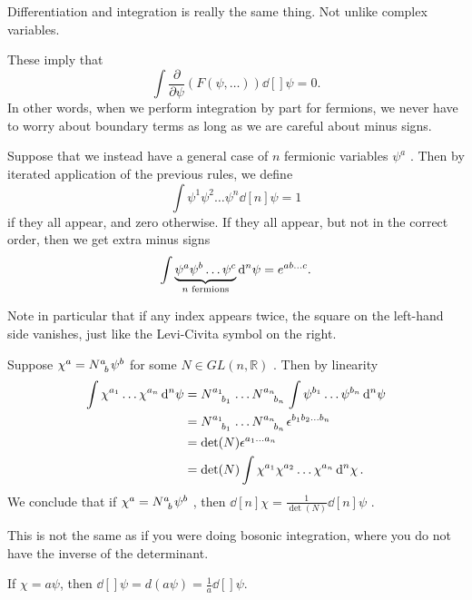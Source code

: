 \begin{leftbar}
  \begin{remark}
    Differentiation and integration is really the same thing. Not unlike complex variables.
  \end{remark}
\end{leftbar}

\begin{remark}
  These imply that
   \begin{equation}
     \int \frac{\partial }{\partial \psi} (F (\psi, \dots)) \dd[]{\psi} = 0.
  \end{equation}
  In other words, when we perform integration by part for fermions, we never have to worry about boundary terms as long as we are careful about minus signs.
\end{remark} 

Suppose that we instead have a general case of $n$  fermionic variables $\psi^{a}$ . Then by iterated application of the previous rules, we define
\begin{equation}
  \int \psi^1 \psi^2 \dots \psi^n \dd[n]{\psi} = 1
\end{equation}
if they all appear, and zero otherwise.
If they all appear, but not in the correct order, then we get extra minus signs
\begin{equation}
  \int \underbrace{\psi^{a} \psi^{b} \dots \psi^{c}}_{\mathclap{n \text{ fermions}}} \dd[n]{\psi} = e^{ab \dots c}.
\end{equation}
\begin{leftbar}
  \begin{remark}
    Note in particular that if any index appears twice, the square on the left-hand side vanishes, just like the Levi-Civita symbol on the right.
  \end{remark}
\end{leftbar}

Suppose $\chi^{a} = N\indices{^{a}_{b}} \psi^{b}$  for some $N \in GL(n , \mathbb{R})$ . Then by linearity
\begin{align}
  \int \chi^{a_1} \dots \chi^{a_n} \dd[n]{\psi} &= N\indices{^{a_1}_{b_1}} \dots N\indices{^{a_n}_{b_n}} \int \psi^{b_1} \dots \psi^{b_n} \dd[n]{\psi} \\
  &= N\indices{^{a_1}_{b_1}} \dots N\indices{^{a_n}_{b_n}} \epsilon^{b_1 b_2 \dots b_n} \\
  &= \det(N) \epsilon^{a_1 \dots a_n} \\
  &= \det(N) \int \chi^{a_1} \chi^{a_2} \dots \chi^{a_n} \dd[n]{\chi}.
\end{align}
We conclude that if $\chi^{a} = N\indices{^{a}_{b}} \psi^{b}$ , then $\dd[n]{\chi} = \frac{1}{\det(N)} \dd[n]{\psi}$ .
\begin{leftbar}
  \begin{remark}
    This is not the same as if you were doing bosonic integration, where you do not have the inverse of the determinant.
  \end{remark}
\end{leftbar}
\begin{example}[]
  If $\chi = a \psi$, then $\dd[]{\psi} = d(a \psi) = \frac{1}{a} \dd[]{\psi}$.
\end{example}

